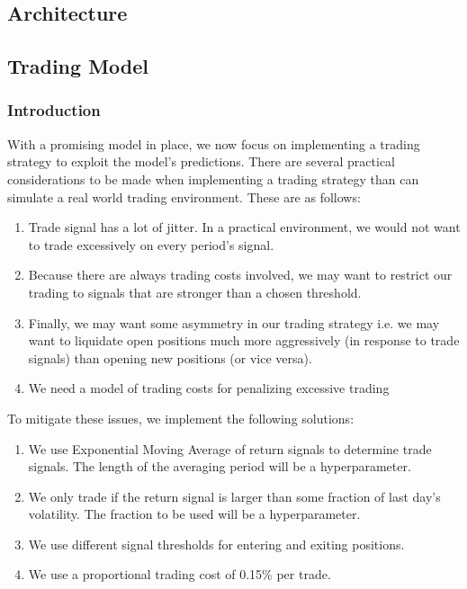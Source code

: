 \documentclass{article}
\begin{document}
\subsection{}



\subsection{}


\subsection{Architecture}



\subsection{Trading Model}

\subsubsection{Introduction}

With a promising model in place, we now focus on implementing a trading strategy to exploit the model's predictions. There are several practical considerations to be made when implementing a trading strategy than can simulate a real world trading environment. These are as follows:

\begin{enumerate}
  \item Trade signal has a lot of jitter. In a practical environment, we would not want to trade excessively on every period's signal.
  \item Because there are always trading costs involved, we may want to restrict our trading to signals that are stronger than a chosen threshold. 
  \item Finally, we may want some asymmetry in our trading strategy i.e. we may want to liquidate open positions much more aggressively (in response to trade signals) than opening new positions (or vice versa).
  \item We need a model of trading costs for penalizing excessive trading
\end{enumerate}

To mitigate these issues, we implement the following solutions:

\begin{enumerate}
  \item We use Exponential Moving Average of return signals to determine trade signals. The length of the averaging period will be a hyperparameter.
  \item We only trade if the return signal is larger than some fraction of last day’s volatility. The fraction to be used will be a hyperparameter.
  \item We use different signal thresholds for entering and exiting positions.
  \item We use a proportional trading cost of 0.15\% per trade.
\end{enumerate}
\end{document}
